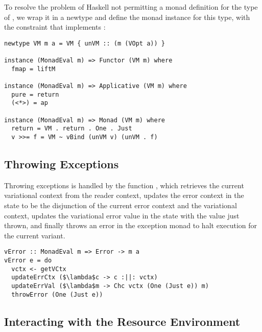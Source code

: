 \documentclass[12pt,oneside]{book}
\begin{document}
To resolve the problem of Haskell not permitting a monad definition for the type of , we wrap
it in a newtype  and define the monad instance for this type, with the constraint that  implements :

\begin{minipage}{\linewidth}
\begin{lstlisting}
newtype VM m a = VM { unVM :: (m (VOpt a)) }

instance (MonadEval m) => Functor (VM m) where
  fmap = liftM

instance (MonadEval m) => Applicative (VM m) where
  pure = return
  (<*>) = ap

instance (MonadEval m) => Monad (VM m) where
  return = VM . return . One . Just
  v >>= f = VM ~ vBind (unVM v) (unVM . f)
  \end{lstlisting}
\end{minipage}
  
\subsection{Throwing Exceptions}
\label{sec:throwing}

Throwing exceptions is handled by the function , which retrieves the current variational context
from the reader context, updates the error context in the state to be the disjunction of the current error context and the variational context,
updates the variational error value in the state with the  value just thrown, and finally throws an error in the exception monad to
halt execution for the current variant.

\begin{lstlisting}
vError :: MonadEval m => Error -> m a
vError e = do
  vctx <- getVCtx
  updateErrCtx ($\lambda$c -> c :||: vctx)
  updateErrVal ($\lambda$m -> Chc vctx (One (Just e)) m)
  throwError (One (Just e))
\end{lstlisting}

\subsection{Interacting with the Resource Environment}
\end{document}
